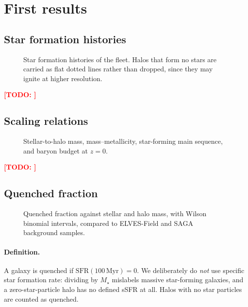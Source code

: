 \documentclass[twocolumn,linenumbers]{aastex631}
\newcommand{\todo}[1]{\textcolor{red}{\textbf{[TODO: #1]}}}
\newcommand{\Mstar}{\ensuremath{M_\star}}
\begin{document}
\section{First results}
\label{sec:results}

\subsection{Star formation histories}
\begin{figure}
\caption{Star formation histories of the fleet. Halos that form no stars are
carried as flat dotted lines rather than dropped, since they may ignite at
higher resolution.}
\label{fig:sfh}
\end{figure}
\todo{}

\subsection{Scaling relations}
\begin{figure}
\caption{Stellar-to-halo mass, mass--metallicity, star-forming main sequence,
and baryon budget at $z=0$.}
\label{fig:scaling}
\end{figure}
\todo{}

\subsection{Quenched fraction}
\label{sec:quenched}

\begin{figure}
\caption{Quenched fraction against stellar and halo mass, with Wilson
binomial intervals, compared to ELVES-Field and SAGA background samples.}
\label{fig:quenched}
\end{figure}

\paragraph{Definition.} A galaxy is quenched if
$\mathrm{SFR}(100\,\mathrm{Myr}) = 0$. We deliberately do \emph{not} use
specific star formation rate: dividing by \Mstar{} mislabels massive
star-forming galaxies, and a zero-star-particle halo has no defined sSFR at
all. Halos with no star particles are counted as quenched.
\end{document}
